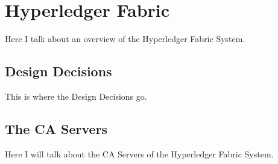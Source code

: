 \section{Hyperledger Fabric}
	\hspace{10mm}Here I talk about an overview of the Hyperledger Fabric System.
	
	\subsection{Design Decisions}
		\hspace{10mm}This is where the Design Decisions go.
		
	\subsection{The CA Servers}
		\hspace{10mm}Here I will talk about the CA Servers of the Hyperledger Fabric System.